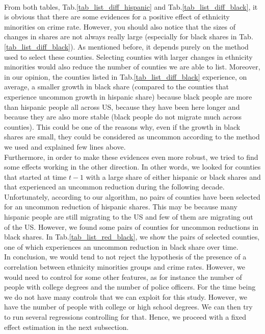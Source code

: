 \documentclass[a4paper,12pt]{article}
\begin{document}
\\From both tables, Tab.\ref{tab_list_diff_hispanic} and Tab.\ref{tab_list_diff_black}, it is obvious that there are some evidences for a positive effect of ethnicity minorities on crime rate. However, you should also notice that the sizes of changes in shares are not always really large (especially for black shares in Tab.\ref{tab_list_diff_black}). As mentioned before, it depends purely on the method used to select these counties. Selecting counties with larger changes in ethnicity minorities would also reduce the number of counties we are able to list. Moreover, in our opinion, the counties listed in Tab.\ref{tab_list_diff_black} experience, on average, a smaller growth in black share (compared to the counties that experience uncommon growth in hispanic share) because black people are more than hispanic people all across US, because they have been here longer and because they are also more stable (black people do not migrate much across counties). This could be one of the reasons why, even if the growth in black shares are small, they could be considered as uncommon according to the method we used and explained few lines above.
\\Furthermore, in order to make these evidences even more robust, we tried to find some effects working in the other direction. In other words, we looked for counties that started at time $t-1$ with a large share of either hispanic or black shares and that experienced an uncommon reduction during the following decade. Unfortunately, according to our algorithm, no pairs of counties have been selected for an uncommon reduction of hispanic shares. This may be because many hispanic people are still migrating to the US and few of them are migrating out of the US. However, we found some pairs of counties for uncommon reductions in black shares. In Tab.\ref{tab_list_red_black}, we show the pairs of selected counties, one of which experiences an uncommon reduction in black share over time.
\\In conclusion, we would tend to not reject the hypothesis of the presence of a correlation between ethnicity minorities groups and crime rates. However, we would need to control for some other features, as for instance the number of people with college degrees and the number of police officers. For the time being we do not have many controls that we can exploit for this study. However, we have the number of people with college or high school degrees. We can then try to run several regressions controlling for that. Hence, we proceed with a fixed effect estimation in the next subsection.
\end{document}
